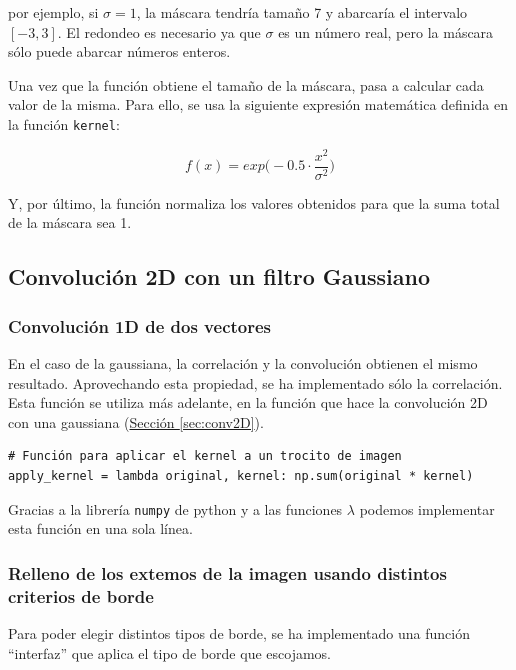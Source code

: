 \documentclass[11pt,a4paper]{article}
\theoremstyle{plain}
\theoremstyle{definition}
\begin{document}
por ejemplo, si $\sigma = 1$, la máscara tendría tamaño 7 y abarcaría el intervalo $[-3,3]$. El redondeo es necesario ya que $\sigma$ es un número real, pero la máscara sólo puede abarcar números enteros.

Una vez que la función obtiene el tamaño de la máscara, pasa a calcular cada valor de la misma. Para ello, se usa la siguiente expresión matemática definida en la función \texttt{kernel}:

\begin{displaymath}
 f(x) = exp \Bigg(-0.5 \cdot \frac{x^2}{\sigma^2} \Bigg)
 \end{displaymath}

Y, por último, la función normaliza los valores obtenidos para que la suma total de la máscara sea 1.

\subsection{Convolución 2D con un filtro Gaussiano}
\subsubsection{Convolución 1D de dos vectores}

En el caso de la gaussiana, la correlación y la convolución obtienen el mismo resultado. Aprovechando esta propiedad, se ha implementado sólo la correlación. Esta función se utiliza más adelante, en la función que hace la convolución 2D con una gaussiana (\hyperref[sec:conv2D]{Sección \ref*{sec:conv2D}}).

\begin{verbatim}
# Función para aplicar el kernel a un trocito de imagen
apply_kernel = lambda original, kernel: np.sum(original * kernel)
\end{verbatim}

Gracias a la librería \texttt{numpy} de python y a las funciones $\lambda$ podemos implementar esta función en una sola línea.

\subsubsection{Relleno de los extemos de la imagen usando distintos criterios de borde}

Para poder elegir distintos tipos de borde, se ha implementado una función ``interfaz'' que aplica el tipo de borde que escojamos.
\end{document}
